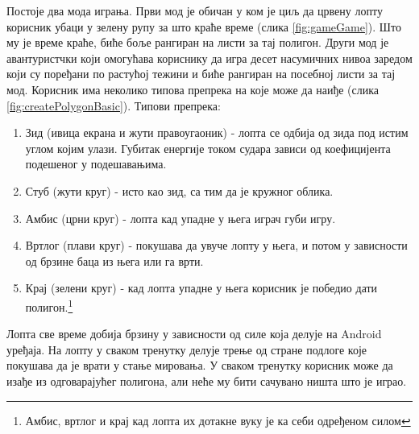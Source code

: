 Постоје два мода играња. Први мод је обичан у ком је циљ да црвену лопту корисник убаци у зелену рупу за што краће време (слика \ref{fig:gameGame}). Што му је време краће, биће боље рангиран на листи за тај полигон. Други мод је авантуристчки који омогућава кориснику да игра десет насумичних нивоа заредом који су поређани по растућој тежини и биће рангиран на посебној листи  за тај мод. Корисник има неколико типова препрека на које може да наиђе (слика \ref{fig:createPolygonBasic}). Типови препрека:
\begin{enumerate}
	\item Зид (ивица екрана и жути правоугаоник) - лопта се одбија од зида под истим углом којим улази. Губитак енергије током судара зависи од коефицијента подешеног у подешавањима.
	\item Стуб (жути круг) - исто као зид, са тим да је кружног облика.
	\item Амбис (црни круг) - лопта кад упадне у њега играч губи игру.
	\item Вртлог (плави круг) - покушава да увуче лопту у њега, и потом у зависности од брзине баца из њега или га врти.
	\item Крај (зелени круг) - кад лопта упадне у њега корисник је победио дати полигон.\footnote{Амбис, вртлог и крај кад лопта их дотакне вуку је ка себи одређеном силом}
\end{enumerate}
Лопта све време добија брзину у зависности од силе која делује на Android уређаја. На лопту у сваком тренутку делује трење од стране подлоге које покушава да је врати у стање мировања. У сваком тренутку корисник може да изађе из одговарајућег полигона, али неће му бити сачувано ништа што је играо.

